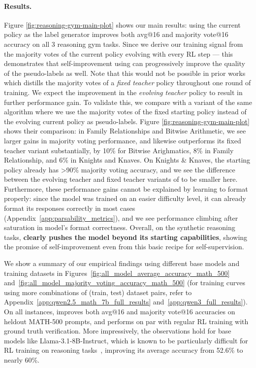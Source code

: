 \paragraph{Results.} Figure \ref{fig:reasoning-gym-main-plot} shows our main results: \algo{} using the current policy as the label generator improves both avg@16 and majority vote@16 accuracy on all 3 reasoning gym tasks. Since we derive our training signal from the majority votes of the current policy evolving with every RL step --- this demonstrates that self-improvement using \algo{} can progressively improve the quality of the pseudo-labels as well. Note that this would not be possible in prior works~\citep{prasad2024selfconsistencypreferenceoptimization,huang-etal-2023-large} which distills the majority votes of a \emph{fixed teacher} policy throughout one round of training. We expect the improvement in the \emph{evolving teacher} policy to result in further performance gain. To validate this, we compare \algo{} with a variant of the same algorithm where we use the majority votes of the fixed starting policy instead of the evolving current policy as pseudo-labels. Figure \ref{fig:reasoning-gym-main-plot} shows their comparison: in Family Relationships and Bitwise Arithmetic, we see larger gains in majority voting performance, and likewise \algo{} outperforms its fixed teacher variant substantially, by 10\% for Bitwise Arighmatics, 8\% in Family Relationship, and 6\% in Knights and Knaves. On Knights \& Knaves, the starting policy already has >90\% majority voting accuracy, and we see the difference between the evolving teacher and fixed teacher variants of \algo{} to be smaller here. Furthermore, these performance gains cannot be explained by learning to format properly: since the model was trained on an easier difficulty level, it can already format its responses correctly in most cases (Appendix~\ref{app:parsability_metrics}), and we see performance climbing after saturation in model's format correctness. Overall, on the synthetic reasoning tasks, \textbf{\algo{} clearly pushes the model beyond its starting capabilities}, showing the promise of self-improvement even from this basic recipe for self-supervision.

We show a summary of our empirical findings using different base models and training datasets in Figures~\ref{fig:all_model_average_accuracy_math_500} and~\ref{fig:all_model_majority_voting_accuracy_math_500} (for training curves using more combinations of (train, test) dataset pairs, refer to Appendix~\ref{app:qwen2.5_math_7b_full_results} and~\ref{app:qwen3_full_results}). On all instances, \algo{} improves both avg@16 and majority vote@16 accuracies on heldout MATH-500 prompts, and performs on par with regular RL training with ground truth verification. More impressively, the observations hold for base models like Llama-3.1-8B-Instruct, which is known to be particularly difficult for RL training on reasoning tasks~\citep{gandhi2025cognitivebehaviorsenableselfimproving}, improving its average accuracy from 52.6\% to nearly 60\%.

